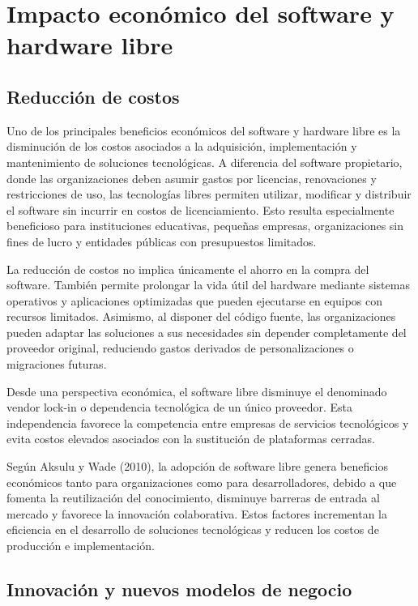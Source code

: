 \documentclass[12pt]{article}
\begin{document}
	\section{Impacto económico del software y hardware libre}
	\subsection{Reducción de costos}

	Uno de los principales beneficios económicos del software y hardware libre es la disminución de los costos asociados a la adquisición, implementación y mantenimiento de soluciones tecnológicas. A diferencia del software propietario, donde las organizaciones deben asumir gastos por licencias, renovaciones y restricciones de uso, las tecnologías libres permiten utilizar, modificar y distribuir el software sin incurrir en costos de licenciamiento. Esto resulta especialmente beneficioso para instituciones educativas, pequeñas empresas, organizaciones sin fines de lucro y entidades públicas con presupuestos limitados.
	
	La reducción de costos no implica únicamente el ahorro en la compra del software. También permite prolongar la vida útil del hardware mediante sistemas operativos y aplicaciones optimizadas que pueden ejecutarse en equipos con recursos limitados. Asimismo, al disponer del código fuente, las organizaciones pueden adaptar las soluciones a sus necesidades sin depender completamente del proveedor original, reduciendo gastos derivados de personalizaciones o migraciones futuras.
	
	Desde una perspectiva económica, el software libre disminuye el denominado vendor lock-in o dependencia tecnológica de un único proveedor. Esta independencia favorece la competencia entre empresas de servicios tecnológicos y evita costos elevados asociados con la sustitución de plataformas cerradas.
	
	Según Aksulu y Wade (2010), la adopción de software libre genera beneficios económicos tanto para organizaciones como para desarrolladores, debido a que fomenta la reutilización del conocimiento, disminuye barreras de entrada al mercado y favorece la innovación colaborativa. Estos factores incrementan la eficiencia en el desarrollo de soluciones tecnológicas y reducen los costos de producción e implementación.
	\subsection{Innovación y nuevos modelos de negocio}
\end{document}
